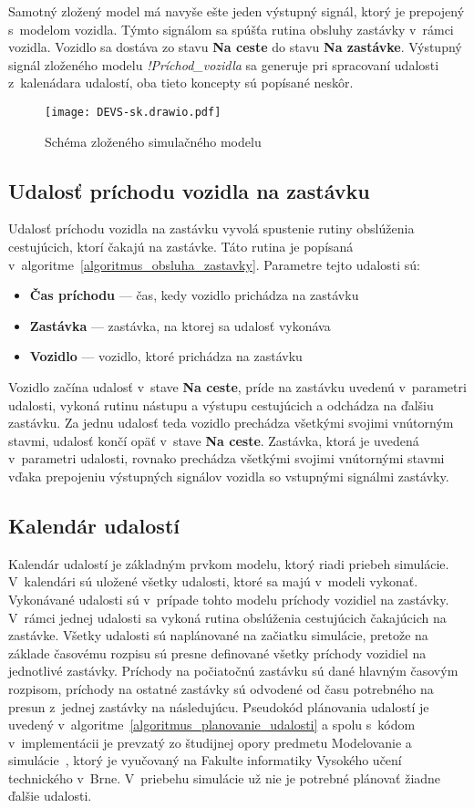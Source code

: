 Samotný zložený model má navyše ešte jeden výstupný signál, ktorý je prepojený s~modelom vozidla.
Týmto signálom sa spúšťa rutina obsluhy zastávky v~rámci vozidla.
Vozidlo sa dostáva zo stavu \textbf{Na ceste} do stavu \textbf{Na zastávke}.
Výstupný signál zloženého modelu \textit{!Príchod\_vozidla} sa generuje pri spracovaní udalosti z~kalenádara udalostí, oba tieto koncepty sú popísané neskôr.

\begin{figure}[h]\label{fig:simulacny_model}
  \centering
  \texttt{[image: DEVS-sk.drawio.pdf]}
  \caption{Schéma zloženého simulačného modelu}
\end{figure}

\subsection*{Udalosť príchodu vozidla na zastávku}
Udalosť príchodu vozidla na zastávku vyvolá spustenie rutiny obslúženia cestujúcich, ktorí čakajú na zastávke. Táto rutina je popísaná v~algoritme~\ref{algoritmus_obsluha_zastavky}.
Parametre tejto udalosti sú:
\begin{itemize}
  \item \textbf{Čas príchodu} --- čas, kedy vozidlo prichádza na zastávku
  \item \textbf{Zastávka} --- zastávka, na ktorej sa udalosť vykonáva
  \item \textbf{Vozidlo} --- vozidlo, ktoré prichádza na zastávku
\end{itemize}

Vozidlo začína udalosť v~stave \textbf{Na ceste}, príde na zastávku uvedenú v~parametri udalosti, vykoná rutinu nástupu a výstupu cestujúcich a odchádza na ďalšiu zastávku.
Za jednu udalosť teda vozidlo prechádza všetkými svojimi vnútorným stavmi, udalosť končí opäť v~stave \textbf{Na ceste}.
Zastávka, ktorá je uvedená v~parametri udalosti, rovnako prechádza všetkými svojimi vnútornými stavmi vďaka prepojeniu výstupných signálov vozidla so vstupnými signálmi zastávky.

\subsection*{Kalendár udalostí}
Kalendár udalostí je základným prvkom modelu, ktorý riadi priebeh simulácie.
V~kalendári sú uložené všetky udalosti, ktoré sa majú v~modeli vykonať.
Vykonávané udalosti sú v~prípade tohto modelu príchody vozidiel na zastávky.
V~rámci jednej udalosti sa vykoná rutina obslúženia cestujúcich čakajúcich na zastávke.
Všetky udalosti sú naplánované na začiatku simulácie, pretože na základe časovému rozpisu sú presne definované všetky príchody vozidiel na jednotlivé zastávky.
Príchody na počiatočnú zastávku sú dané hlavným časovým rozpisom, príchody na ostatné zastávky sú odvodené od času potrebného na presun z~jednej zastávky na následujúcu.
Pseudokód plánovania udalostí je uvedený v~algoritme~\ref{algoritmus_planovanie_udalosti} a spolu s~kódom v~implementácii je prevzatý zo študijnej opory predmetu Modelovanie a simulácie~\cite{peringer2022ims}, ktorý je vyučovaný na Fakulte informatiky Vysokého učení technického v~Brne.
V~priebehu simulácie už nie je potrebné plánovať žiadne ďalšie udalosti.

